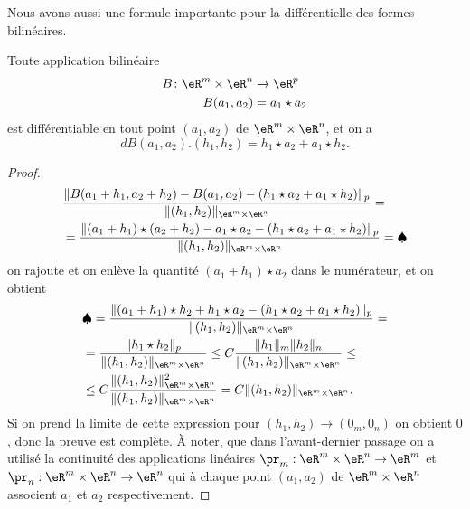 Nous avons aussi une formule importante pour la différentielle des formes bilinéaires.
  \begin{lemma}\label{bilin_diff}
    Toute application bilinéaire 
    \begin{equation}
	    \begin{aligned}
		    B\colon \eR^m\times\eR^n&\to \eR^p \\
		    B(a_1,a_2)&=a_1 \star a_2
	    \end{aligned}
    \end{equation}
    est différentiable en tout point $(a_1,a_2)$ de $\eR^m\times\eR^n$, et on a
\[
dB(a_1,a_2).(h_1,h_2)=h_1\star a_2 + a_1\star h_2.
\] 
  \end{lemma}
  \begin{proof}
    \begin{equation}
      \begin{aligned}
  & \frac{\|B(a_1+h_1,a_2+h_2)-B(a_1,a_2)-(h_1\star a_2 + a_1\star h_2)\|_p}{\|(h_1,h_2)\|_{\eR^m\times\eR^n}} = \\ 
&= \frac{\|(a_1+h_1)\star(a_2+h_2)-a_1\star a_2-(h_1\star a_2 + a_1\star h_2)\|_p}{\|(h_1,h_2)\|_{\eR^m\times\eR^n}}=\spadesuit
 \end{aligned}
    \end{equation}
on rajoute et on enlève la quantité $(a_1+h_1)\star a_2$ dans le numérateur, et on obtient  
   \begin{equation}
      \begin{aligned}
&\spadesuit= \frac{\|(a_1+h_1)\star h_2+h_1\star a_2-(h_1\star a_2 + a_1\star h_2)\|_p}{\|(h_1,h_2)\|_{\eR^m\times\eR^n}}=\\
&= \frac{\|h_1\star h_2\|_p}{\|(h_1,h_2)\|_{\eR^m\times\eR^n}}\leq C\frac{\|h_1\|_m\|h_2\|_n}{\|(h_1,h_2)\|_{\eR^m\times\eR^n}}\leq\\
&\leq C\frac{\|(h_1,h_2)\|^2_{\eR^m\times\eR^n}}{\|(h_1,h_2)\|_{\eR^m\times\eR^n}}= C\|(h_1,h_2)\|_{\eR^m\times\eR^n}.
      \end{aligned}
    \end{equation}
Si on prend la limite de cette expression pour $(h_1,h_2)\to (0_m,0_n)$ on obtient $0$, donc la preuve est complète. À noter, que dans l'avant-dernier passage on a utilisé la continuité des applications linéaires $\pr_m:\eR^m\times\eR^n\to \eR^m$ et $\pr_n: \eR^m\times\eR^n\to \eR^n$ qui à chaque point $(a_1,a_2)$ de $\eR^m\times\eR^n$ associent $a_1$ et $a_2$ respectivement.  
  \end{proof}

